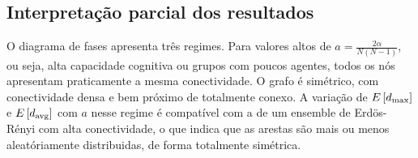 
\subsection{Interpretação parcial dos resultados}

O diagrama de fases apresenta três regimes. Para valores altos de $a = \frac{2\alpha}{N(N-1)}$, ou seja, alta capacidade cognitiva ou grupos com poucos agentes, todos os nós apresentam praticamente a mesma conectividade. O grafo é simétrico, com conectividade densa e bem próximo de totalmente conexo. A variação de $E\left[d_{\text{max}}\right]$ e $E\left[d_{\text{avg}}\right]$ com $a$ nesse regime é compatível com a de um ensemble de Erdös-Rényi com alta conectividade, o que indica que as arestas são mais ou menos aleatóriamente distribuidas, de forma totalmente simétrica.

